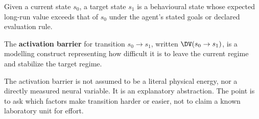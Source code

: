 \begin{definition}
Given a current state $s_0$, a target state $s_1$ is a behavioural state whose
expected long-run value exceeds that of $s_0$ under the agent's stated goals
or declared evaluation rule.
\end{definition}

\begin{definition}
The \textbf{activation barrier} for transition $s_0 \to s_1$, written
$\DV(s_0 \to s_1)$, is a modelling construct representing how difficult it is
to leave the current regime and stabilize the target regime.
\end{definition}

\begin{remark}
The activation barrier is not assumed to be a literal physical energy, nor a
directly measured neural variable. It is an explanatory abstraction. The point
is to ask which factors make transition harder or easier, not to claim a known
laboratory unit for effort.
\end{remark}
